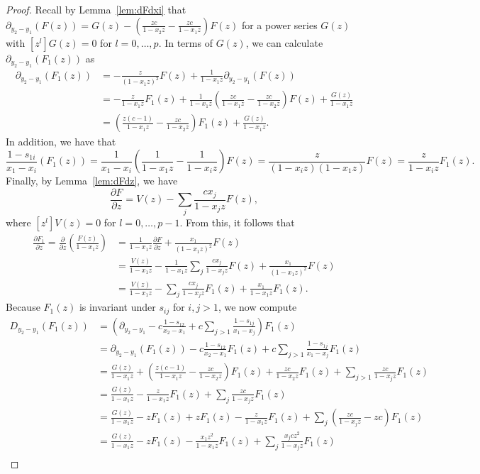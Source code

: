 \documentclass{amsart}
\numberwithin{equation}{section}
\theoremstyle{definition}
\begin{document}
\begin{proof}
Recall by Lemma~\ref{lem:dFdxi} that $\partial_{y_2-y_1}(F(z))= G(z) - \left(\frac{zc}{1-x_2z}-\frac{zc}{1-x_1z}\right)F(z)$ for a power series $G(z)$ with $[z^l]G(z)=0$ for $l=0,\dots,p$. In terms of $G(z)$, we can calculate $\partial_{y_2-y_1}(F_1(z))$ as
\begin{align*}
\partial_{y_2-y_1}(F_1(z))
&=-\frac{z}{(1-x_1z)^2}F(z)+\frac{1}{1-x_1z}\partial_{y_2-y_1}(F(z))\\
&=-\frac{z}{1-x_1z}F_1(z)+\frac{1}{1-x_1z}\left(\frac{zc}{1-x_1z}-\frac{zc}{1-x_2z}\right)F(z)+\frac{G(z)}{1-x_1z}\\
&=\left(\frac{z(c-1)}{1-x_1z}-\frac{zc}{1-x_2z}\right)F_1(z)+\frac{G(z)}{1-x_1z}.
\end{align*}
In addition, we have that 
\[
\frac{1-s_{1i}}{x_1-x_i}(F_1(z))
=\frac{1}{x_1-x_i}\left(\frac{1}{1-x_1z}-\frac{1}{1-x_iz}\right)F(z)=\frac{z}{(1-x_iz)(1-x_1z)}F(z)=\frac{z}{1-x_iz}F_1(z).
\]
Finally, by Lemma~\ref{lem:dFdz}, we have
\[
\frac{\partial F}{\partial z}=V(z) - \sum_j \frac{cx_j}{1-x_jz}F(z),
\]
where $[z^l]V(z)=0$ for $l=0,\dots,p-1$. From this, it follows that
\begin{align*}
\frac{\partial F_1}{\partial z} = \frac{\partial}{\partial z}\left(\frac{F(z)}{1-x_1z}\right) &=\frac{1}{1-x_1z} \frac{\partial F}{\partial z}+\frac{x_1}{(1-x_1z)^2} F(z)\\
&=\frac{V(z)}{1-x_1z}-\frac{1}{1-x_1z}\sum_j \frac{cx_j}{1-x_jz}F(z)+\frac{x_1}{(1-x_1z)^2} F(z)\\
&=\frac{V(z)}{1-x_1z} - \sum_j \frac{cx_j}{1-x_jz}F_1(z)+\frac{x_1}{1-x_1z} F_1(z).
\end{align*}
Because $F_1(z)$ is invariant under $s_{ij}$ for $i,j > 1$, we now compute
\begin{align*}
D_{y_2-y_1}(F_1(z))&=\left(\partial_{y_2-y_1}-c\frac{1-s_{12}}{x_2-x_1}+c\sum_{j > 1} \frac{1-s_{1j}}{x_1-x_j}\right)F_1(z)\\
&=\partial_{y_2-y_1}(F_1(z))-c\frac{1-s_{12}}{x_2-x_1}F_1(z)+c\sum_{j > 1} \frac{1-s_{1j}}{x_1-x_j}F_1(z)\\
&=\frac{G(z)}{1-x_1z}+\left(\frac{z(c-1)}{1-x_1z}-\frac{zc}{1-x_2z}\right)F_1(z)+\frac{zc}{1-x_2z}F_1(z)+\sum_{j > 1} \frac{zc}{1-x_jz}F_1(z)\\
&=\frac{G(z)}{1-x_1z}-\frac{z}{1-x_1z}F_1(z)+\sum_{j} \frac{zc}{1-x_jz}F_1(z)\\
&=\frac{G(z)}{1-x_1z}-zF_1(z)+zF_1(z)-\frac{z}{1-x_1z}F_1(z) + \sum_{j} \left(\frac{zc}{1-x_jz} - zc\right) F_1(z)\\
&=\frac{G(z)}{1-x_1z}-zF_1(z)-\frac{x_1z^2}{1-x_1z}F_1(z)+\sum_{j} \frac{x_jcz^2}{1-x_jz}F_1(z)\\

\end{align*}
\end{proof}
\end{document}
